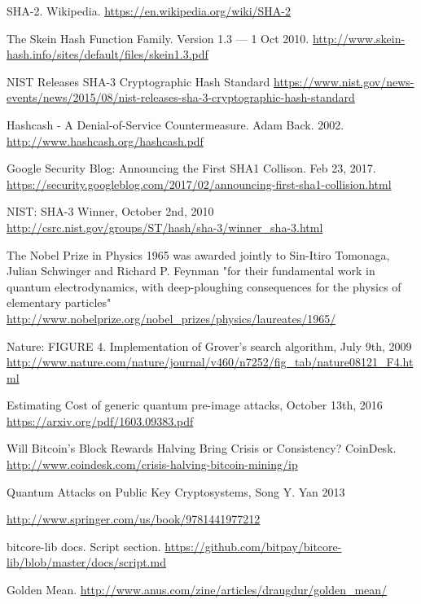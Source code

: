 \documentclass[11pt]{article}
\begin{document}
\begin{thebibliography}{7}
SHA-2. Wikipedia.
\url{https://en.wikipedia.org/wiki/SHA-2}

The Skein Hash Function Family. Version 1.3 — 1 Oct 2010.
\url{http://www.skein-hash.info/sites/default/files/skein1.3.pdf}

NIST Releases SHA-3 Cryptographic Hash Standard \url{https://www.nist.gov/news-events/news/2015/08/nist-releases-sha-3-cryptographic-hash-standard}

Hashcash - A Denial-of-Service Countermeasure. Adam Back. 2002. \url{http://www.hashcash.org/hashcash.pdf}

Google Security Blog: Announcing the First SHA1 Collison. Feb 23, 2017.
\url{https://security.googleblog.com/2017/02/announcing-first-sha1-collision.html}

NIST: SHA-3 Winner, October 2nd, 2010
\url{http://csrc.nist.gov/groups/ST/hash/sha-3/winner_sha-3.html}

The Nobel Prize in Physics 1965 was awarded jointly to Sin-Itiro Tomonaga, Julian Schwinger and Richard P. Feynman "for their fundamental work in quantum electrodynamics, with deep-ploughing consequences for the physics of elementary particles"
\url{http://www.nobelprize.org/nobel_prizes/physics/laureates/1965/}


Nature: FIGURE 4. Implementation of Grover's search algorithm, July 9th, 2009
\url{http://www.nature.com/nature/journal/v460/n7252/fig_tab/nature08121_F4.html}


Estimating Cost of generic quantum pre-image attacks, October 13th, 2016
\url{https://arxiv.org/pdf/1603.09383.pdf}

Will Bitcoin's Block Rewards Halving Bring Crisis or Consistency? CoinDesk.
\url{http://www.coindesk.com/crisis-halving-bitcoin-mining/ip}


Quantum Attacks on Public Key Cryptosystems, Song Y. Yan 2013

\url{http://www.springer.com/us/book/9781441977212}

bitcore-lib docs. Script section.
\url{https://github.com/bitpay/bitcore-lib/blob/master/docs/script.md}

Golden Mean.
\url{http://www.anus.com/zine/articles/draugdur/golden_mean/}


\end{thebibliography}
\end{document}
